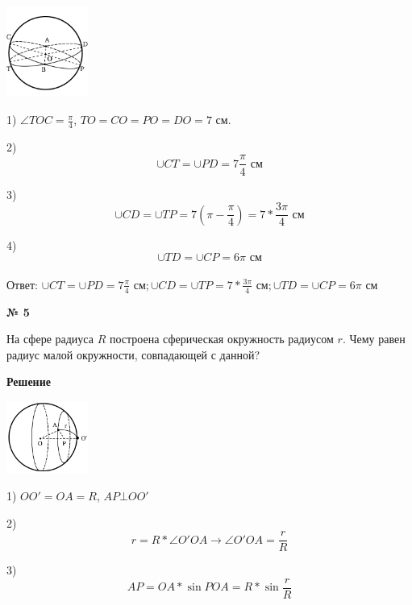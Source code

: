     \begin{center}
        \includegraphics[width=0.2\textwidth]{images/img8}\\
    \end{center}

    1) $\angle TOC = \frac{\pi}{4}$, $TO = CO = PO = DO = 7$ см.

    2)
    \[
        \cup CT = \cup PD = 7\frac{\pi}{4} \text{ см}
    \]

    3) \[
           \cup CD = \cup TP = 7\left(\pi - \frac{\pi}{4}\right) = 7*\frac{3\pi}{4}\text{ см}
    \]

    4) \[
           \cup TD = \cup CP = 6\pi \text{ см}
    \]\\

    Ответ: $\cup CT = \cup PD = 7\frac{\pi}{4} \text{ см}; \cup CD = \cup TP = 7*\frac{3\pi}{4}\text{ см}; \cup TD = \cup CP = 6\pi \text{ см}$

    \begin{center}
        \textbf{№ 5}
    \end{center}

    На сфере радиуса $R$ построена сферическая окружность радиусом $r$.
    Чему равен радиус малой окружности, совпадающей с данной?

    \textbf{Решение}\\

    \begin{center}
        \includegraphics[width=0.2\textwidth]{images/img9}\\
    \end{center}

    1) $OO' = OA = R$, $AP \bot OO'$

    2)
    \[
        r = R*\angle O'OA \rightarrow \angle O'OA = \frac{r}{R}
    \]

    3)
    \[
        AP = OA * \sin POA = R * \sin \frac{r}{R}
    \]

